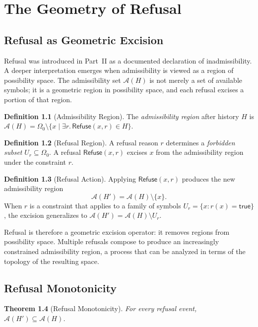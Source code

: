 \documentclass[12pt, a4paper, openany]{book}
\theoremstyle{plain}
\newtheorem{theorem}{Theorem}[chapter]
\theoremstyle{definition}
\newtheorem{definition}[theorem]{Definition}
\theoremstyle{remark}
\newcommand{\Refuse}{\mathsf{Refuse}}
\newcommand{\calA}{\mathcal{A}}
\begin{document}
\chapter{The Geometry of Refusal}

\section{Refusal as Geometric Excision}

Refusal was introduced in Part~II as a documented declaration of inadmissibility.
A deeper interpretation emerges when admissibility is viewed as a region of
possibility space. The admissibility set $\calA(H)$ is not merely a set of
available symbols; it is a geometric region in possibility space, and each refusal
excises a portion of that region.

\begin{definition}[Admissibility Region]
The \emph{admissibility region} after history $H$ is
$\calA(H) = \Omega_0 \setminus \{x \mid \exists r.\, \Refuse(x,r) \in H\}$.
\end{definition}

\begin{definition}[Refusal Region]
A refusal reason $r$ determines a \emph{forbidden subset} $U_r \subseteq \Omega_0$.
A refusal $\Refuse(x, r)$ excises $x$ from the admissibility region under
the constraint $r$.
\end{definition}

\begin{definition}[Refusal Action]
Applying $\Refuse(x, r)$ produces the new admissibility region
\[
\calA(H') = \calA(H) \setminus \{x\}.
\]
When $r$ is a constraint that applies to a family of symbols
$U_r = \{x : r(x) = \mathsf{true}\}$, the excision generalizes to
$\calA(H') = \calA(H) \setminus U_r$.
\end{definition}

Refusal is therefore a geometric excision operator: it removes regions from
possibility space. Multiple refusals compose to produce an increasingly constrained
admissibility region, a process that can be analyzed in terms of the topology of
the resulting space.

\section{Refusal Monotonicity}

\begin{theorem}[Refusal Monotonicity]
For every refusal event, $\calA(H') \subseteq \calA(H)$.
\end{theorem}
\end{document}
